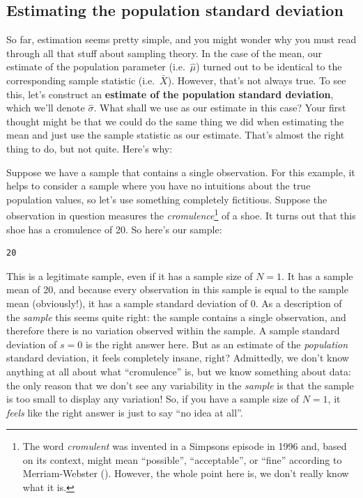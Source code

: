 \documentclass[
  11pt,
  a4paper,
  twoside,symmetric,openright]{book}
\theoremstyle{break}
\theoremstyle{break}
\begin{document}
\subsection{Estimating the population standard deviation}\label{estimating-the-population-standard-deviation}

So far, estimation seems pretty simple, and you might wonder why you must read through all that stuff about sampling theory. In the case of the mean, our estimate of the population parameter (i.e.~\(\hat\mu\)) turned out to be identical to the corresponding sample statistic (i.e.~\(\bar{X}\)). However, that's not always true. To see this, let's construct an \textbf{estimate of the population standard deviation}, which we'll denote \(\hat\sigma\). What shall we use as our estimate in this case? Your first thought might be that we could do the same thing we did when estimating the mean and just use the sample statistic as our estimate. That's almost the right thing to do, but not quite. Here's why:

Suppose we have a sample that contains a single observation. For this example, it helps to consider a sample where you have no intuitions about the true population values, so let's use something completely fictitious. Suppose the observation in question measures the \emph{cromulence}\footnote{The word \emph{cromulent} was invented in a Simpsons episode in 1996 and, based on its context, might mean ``possible'', ``acceptable'', or ``fine'' according to Merriam-Webster (). However, the whole point here is, we don't really know what it is.} of a shoe. It turns out that this shoe has a cromulence of 20. So here's our sample:

\begin{verbatim}
20
\end{verbatim}

This is a legitimate sample, even if it has a sample size of \(N=1\). It has a sample mean of 20, and because every observation in this sample is equal to the sample mean (obviously!), it has a sample standard deviation of 0. As a description of the \emph{sample} this seems quite right: the sample contains a single observation, and therefore there is no variation observed within the sample. A sample standard deviation of \(s = 0\) is the right answer here. But as an estimate of the \emph{population} standard deviation, it feels completely insane, right? Admittedly, we don't know anything at all about what ``cromulence'' is, but we know something about data: the only reason that we don't see any variability in the \emph{sample} is that the sample is too small to display any variation! So, if you have a sample size of \(N=1\), it \emph{feels} like the right answer is just to say ``no idea at all''.
\end{document}
